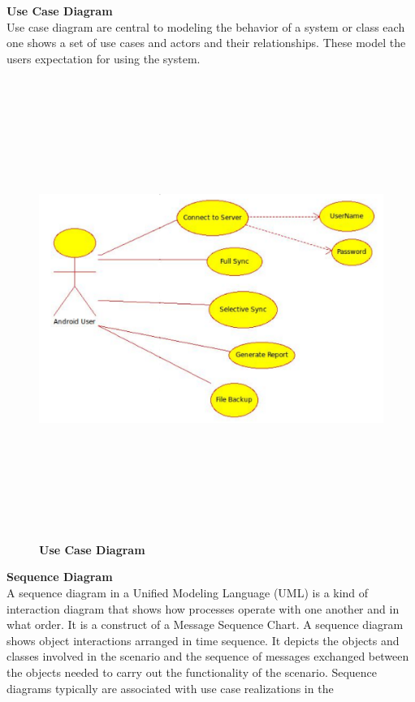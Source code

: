 \newpage
\textbf{Use Case Diagram}\\
\hspace*{0.82cm}Use case diagram are central to modeling the behavior of a system or class each one
shows a set of use cases and actors and their relationships. These model the users expectation
for using the system.\\[1cm]
\begin{figure}[H]
  \centering
    \includegraphics[height= 15cm, width=15cm]{project/images/use-case}
  \caption{\textbf{Use Case Diagram}}
\end{figure}
\newpage
\textbf{Sequence Diagram}\\
\hspace*{0.82cm}A sequence diagram in a Unified Modeling Language (UML) is a kind of interaction
diagram that shows how processes operate with one another and in what order. It is a
construct of a Message Sequence Chart. A sequence diagram shows object interactions
arranged in time sequence. It depicts the objects and classes involved in the scenario and the
sequence of messages exchanged between the objects needed to carry out the functionality of
the scenario. Sequence diagrams typically are associated with use case realizations in the
